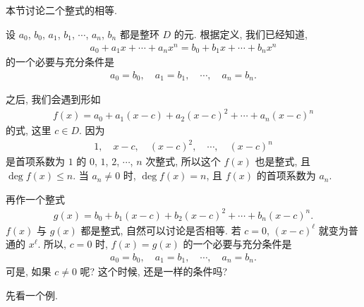 \subsection*{\PolynomialEquality}
\markright{\PolynomialEquality}

本节讨论二个整式的相等.

设 $a_0$, $b_0$, $a_1$, $b_1$, $\cdots$, $a_n$, $b_n$ 都是整环 $D$ 的元. 根据定义, 我们已经知道,
\begin{align*}
    a_0 + a_1 x + \cdots + a_n x^n = b_0 + b_1 x + \cdots + b_n x^n
\end{align*}
的一个必要与充分条件是
\begin{align*}
    a_0 = b_0, \quad a_1 = b_1, \quad \cdots, \quad a_n = b_n.
\end{align*}

之后, 我们会遇到形如
\begin{align*}
    f(x) = a_0 + a_1 (x - c) + a_2 (x - c)^2 + \cdots + a_n (x - c)^n
\end{align*}
的式, 这里 $c \in D$. 因为
\begin{align*}
    1, \quad x-c, \quad (x-c)^2, \quad \cdots, \quad (x-c)^n
\end{align*}
是首项系数为 $1$ 的 $0$, $1$, $2$, $\cdots$, $n$ 次整式, 所以这个 $f(x)$ 也是整式, 且 $\deg f(x) \leq n$. 当 $a_n \neq 0$ 时, $\deg f(x) = n$, 且 $f(x)$ 的首项系数为 $a_n$.

再作一个整式
\begin{align*}
    g(x) = b_0 + b_1 (x - c) + b_2 (x - c)^2 + \cdots + b_n (x - c)^n.
\end{align*}
$f(x)$ 与 $g(x)$ 都是整式, 自然可以讨论是否相等. 若 $c=0$, $(x-c)^\ell$ 就变为普通的 $x^\ell$. 所以, $c=0$ 时, $f(x)=g(x)$ 的一个必要与充分条件是
\begin{align*}
    a_0 = b_0, \quad a_1 = b_1, \quad \cdots, \quad a_n = b_n.
\end{align*}
可是, 如果 $c \neq 0$ 呢? 这个时候, 还是一样的条件吗?

先看一个例.

